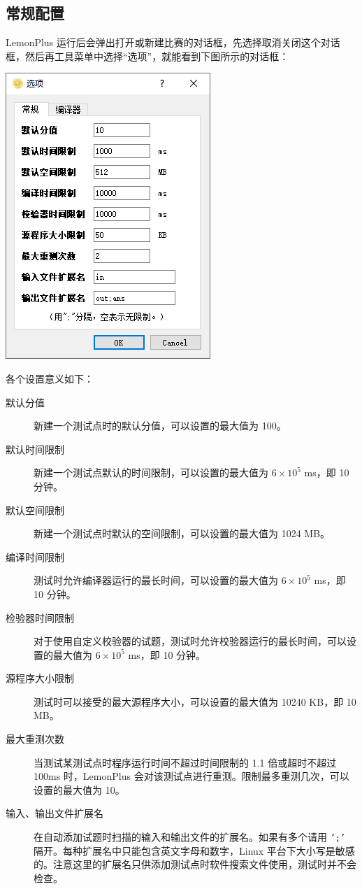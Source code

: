 \documentclass[12pt, a4paper]{article}
\begin{document}
\subsection{常规配置}
LemonPlus 运行后会弹出打开或新建比赛的对话框，先选择取消关闭这个对话框，然后再工具菜单中选择“选项”，就能看到下图所示的对话框：

\begin{center}
\includegraphics[scale=0.7]{pic/generalsettings.png}
\end{center}

各个设置意义如下：

\begin{description}
\item[默认分值] 新建一个测试点时的默认分值，可以设置的最大值为 100。
\item[默认时间限制] 新建一个测试点默认的时间限制，可以设置的最大值为 $6 \times 10^5$ ms，即 10 分钟。
\item[默认空间限制] 新建一个测试点时默认的空间限制，可以设置的最大值为 1024 MB。
\item[编译时间限制] 测试时允许编译器运行的最长时间，可以设置的最大值为 $6 \times 10^5$ ms，即 10 分钟。
\item[检验器时间限制] 对于使用自定义校验器的试题，测试时允许校验器运行的最长时间，可以设置的最大值为 $6 \times 10^5$ ms，即 10 分钟。
\item[源程序大小限制] 测试时可以接受的最大源程序大小，可以设置的最大值为 10240 KB，即 10 MB。
\item[最大重测次数] 当测试某测试点时程序运行时间不超过时间限制的 1.1 倍或超时不超过 100ms 时，LemonPlus 会对该测试点进行重测。限制最多重测几次，可以设置的最大值为 10。
\item[输入、输出文件扩展名]  在自动添加试题时扫描的输入和输出文件的扩展名。如果有多个请用 \texttt{';'} 隔开。每种扩展名中只能包含英文字母和数字，Linux 平台下大小写是敏感的。注意这里的扩展名只供添加测试点时软件搜索文件使用，测试时并不会检查。
\end{description}
\end{document}
